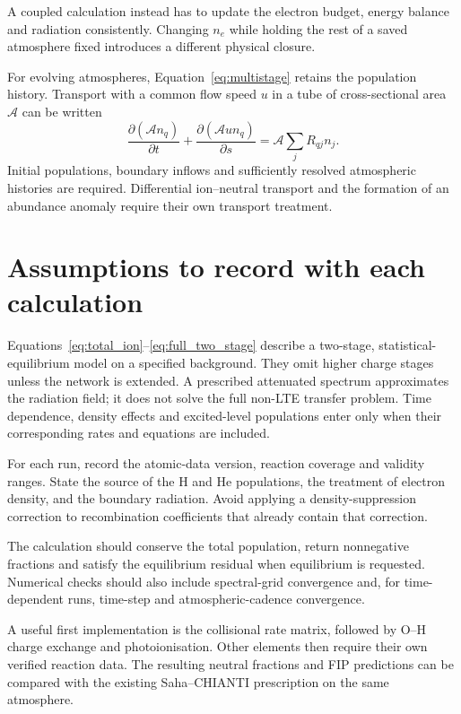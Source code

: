 \documentclass[a4paper,10pt,twoside,openany]{book}
\numberwithin{equation}{chapter}
\newenvironment{caution}{%
  \begin{tcolorbox}[bookbox,colback=LightOrange,colframe=Cap2Orange,
    colbacktitle=Cap2Orange,coltitle=white,
    title={Scope of the approximation}]}{\end{tcolorbox}}
\begin{document}
A coupled calculation instead has to update the electron budget,
energy balance and radiation consistently. Changing $n_e$
while holding the rest of a saved atmosphere fixed introduces a
different physical closure.

For evolving atmospheres, Equation~\eqref{eq:multistage} retains
the population history. Transport with a common flow speed $u$
in a tube of cross-sectional area $\mathcal A$ can be written
\begin{equation}
  \frac{\partial(\mathcal A n_q)}{\partial t}
  +\frac{\partial(\mathcal A u n_q)}{\partial s}
  =\mathcal A\sum_jR_{qj}n_j.
\end{equation}
Initial populations, boundary inflows and sufficiently resolved
atmospheric histories are required. Differential ion--neutral
transport and the formation of an abundance anomaly require
their own transport treatment.

\section{Assumptions to record with each calculation}
\begin{caution}
Equations~\eqref{eq:total_ion}--\eqref{eq:full_two_stage} describe
a two-stage, statistical-equilibrium model on a specified
background. They omit higher charge stages unless the network
is extended. A prescribed attenuated spectrum approximates the
radiation field; it does not solve the full non-LTE transfer
problem. Time dependence, density effects and excited-level
populations enter only when their corresponding rates and
equations are included.
\end{caution}

For each run, record the atomic-data version, reaction coverage
and validity ranges. State the source of the H and He populations,
the treatment of electron density, and the boundary radiation.
Avoid applying a density-suppression correction to recombination
coefficients that already contain that correction.

The calculation should conserve the total population, return
nonnegative fractions and satisfy the equilibrium residual when
equilibrium is requested. Numerical checks should also include
spectral-grid convergence and, for time-dependent runs, time-step
and atmospheric-cadence convergence.

A useful first implementation is the collisional rate matrix,
followed by O--H charge exchange and photoionisation. Other
elements then require their own verified reaction data.
The resulting neutral fractions and FIP predictions can be
compared with the existing Saha--CHIANTI prescription on the
same atmosphere.
\end{document}
